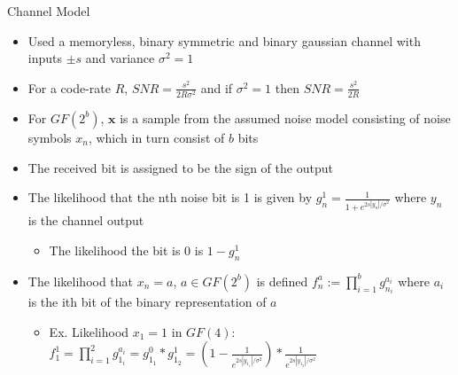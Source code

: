 \documentclass[10pt,ignorenonframetext,]{beamer}
\providecommand{\tightlist}{%
  \setlength{\itemsep}{0pt}\setlength{\parskip}{0pt}}
\begin{document}
\begin{frame}{Channel Model}
\protect\hypertarget{channel-model}{}
\begin{itemize}[<+->]
\tightlist
\item
  Used a memoryless, binary symmetric and binary gaussian channel with
  inputs \(\pm s\) and variance \(\sigma^2=1\)
\item
  For a code-rate \(R\), \(SNR=\frac{s^2}{2R\sigma^2}\) and if
  \(\sigma^2=1\) then \(SNR=\frac{s^2}{2R}\)
\item
  For \(GF(2^b)\), \(\textbf{x}\) is a sample from the assumed noise
  model consisting of noise symbols \(x_n\), which in turn consist of
  \(b\) bits
\item
  The received bit is assigned to be the sign of the output
\item
  The likelihood that the nth noise bit is 1 is given by
  \(g_n^1=\frac{1}{1+e^{2s|y_n|/\sigma^2}}\) where \(y_n\) is the
  channel output

  \begin{itemize}[<+->]
  \tightlist
  \item
    The likelihood the bit is 0 is \(1-g_n^1\)
  \end{itemize}
\item
  The likelihood that \(x_n=a\), \(a\in GF(2^b)\) is defined
  \(f^a_n:=\prod_{i=1}^b g^{a_i}_{n_i}\) where \(a_i\) is the ith bit of
  the binary representation of \(a\)

  \begin{itemize}[<+->]
  \tightlist
  \item
    Ex. Likelihood \(x_1=1\) in \(GF(4)\):
    \(f^1_1 = \prod_{i=1}^2 g^{a_i}_{1_i} = g^{0}_{1_1} * g^1_{1_2} = (1-\frac{1}{e^{2s|y_{1_1}|/\sigma^2}}) * \frac{1}{e^{2s|y_{1_2}|/\sigma^2}}\)
  \end{itemize}
\end{itemize}
\end{frame}
\end{document}
